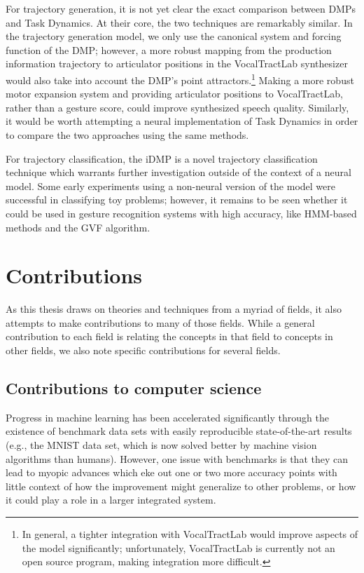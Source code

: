 For trajectory generation,
it is not yet clear
the exact comparison between DMPs
and Task Dynamics.
At their core, the two techniques
are remarkably similar.
In the trajectory generation model,
we only use the canonical system
and forcing function of the DMP;
however, a more robust mapping
from the production information trajectory
to articulator positions in
the VocalTractLab synthesizer
would also take into account
the DMP's point attractors.\footnote{
  In general, a tighter integration with
  VocalTractLab would improve aspects
  of the model significantly;
  unfortunately, VocalTractLab
  is currently not an open source program,
  making integration more difficult.}
Making a more robust motor expansion system
and providing articulator positions
to VocalTractLab,
rather than a gesture score,
could improve synthesized speech quality.
Similarly, it would be worth
attempting a neural implementation
of Task Dynamics in order to
compare the two approaches
using the same methods.

For trajectory classification,
the iDMP is a novel trajectory classification technique
which warrants further investigation
outside of the context of a neural model.
Some early experiments using a non-neural
version of the model were successful in
classifying toy problems;
however, it remains to be seen
whether it could be used in
gesture recognition systems
with high accuracy,
like HMM-based methods and the GVF algorithm.

\section{Contributions}

As this thesis draws on theories
and techniques from a myriad of fields,
it also attempts to make contributions
to many of those fields.
While a general contribution to each field
is relating the concepts in that field
to concepts in other fields,
we also note specific contributions
for several fields.

\subsection{Contributions to computer science}

Progress in machine learning
has been accelerated significantly
through the existence of
benchmark data sets with
easily reproducible
state-of-the-art results
(e.g., the MNIST data set,
which is now solved better
by machine vision algorithms than humans).
However, one issue with benchmarks
is that they can lead to myopic advances
which eke out one or two more
accuracy points with little
context of how the improvement
might generalize to other problems,
or how it could play a role
in a larger integrated system.

